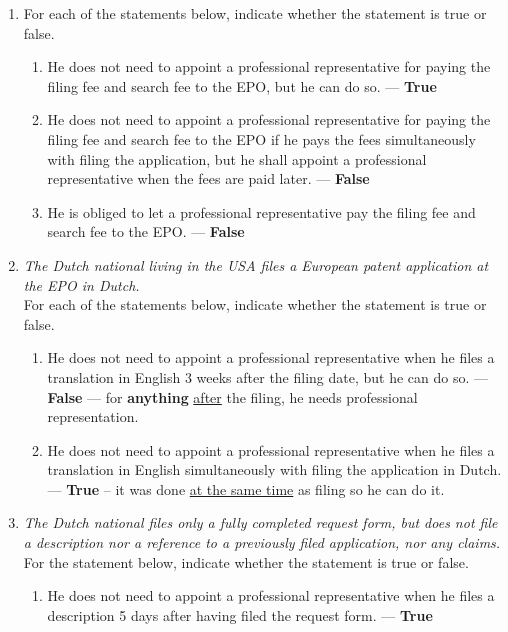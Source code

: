 \documentclass{report}
\newcommand{\T}{--- \textbf{True} }
\newcommand{\F}{--- \textbf{False} }
\begin{document}
\begin{enumerate}[label=\textbf{Answer \arabic*}]
\begin{enumerate}[label=\textbf{Answer \arabic*}]
\begin{enumerate}[label=(\alph*)]
        \item For each of the statements below, indicate whether the statement is true or false.
        \begin{enumerate}[label={(\alph{enumi}.\arabic*)}]
            \item He does not need to appoint a professional representative for paying the filing fee and search fee to the EPO, but he can do so. \T
            \item He does not need to appoint a professional representative for paying the filing fee and search fee to the EPO if he pays the fees simultaneously with filing the application, but he shall appoint a professional representative when the fees are paid later. \F
            \item He is obliged to let a professional representative pay the filing fee and search fee to the EPO. \F
        \end{enumerate}
        
        \item \textit{The Dutch national living in the USA files a European patent application at the EPO in Dutch.} \\
        For each of the statements below, indicate whether the statement is true or false.
        \begin{enumerate}[label={(\alph{enumi}.\arabic*)}]
            \item He does not need to appoint a professional representative when he files a translation in English 3 weeks after the filing date, but he can do so. \F --- for \textbf{anything} \underline{after} the filing, he needs professional representation.
            \item He does not need to appoint a professional representative when he files a translation in English simultaneously with filing the application in Dutch. \T -- it was done \underline{at the same time} as filing so he can do it.
        \end{enumerate}
        
        \item \textit{The Dutch national files only a fully completed request form, but does not file a description nor a reference to a previously filed application, nor any claims.} \\
        For the statement below, indicate whether the statement is true or false.
        \begin{enumerate}[label={(\alph{enumi}.\arabic*)}]
            \item He does not need to appoint a professional representative when he files a description 5 days after having filed the request form. \T
        \end{enumerate}
        

\end{enumerate}
\end{enumerate}
\end{enumerate}
\end{document}
